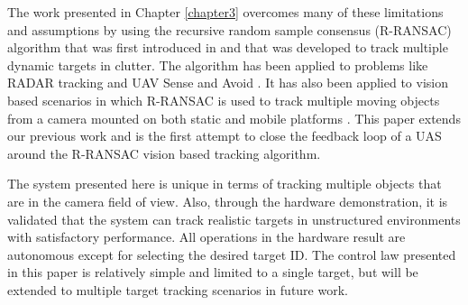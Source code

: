The work presented in Chapter \ref{chapter3} overcomes many of these limitations and assumptions by using the recursive random sample consensus (R-RANSAC) algorithm that was first introduced in \cite{Niedfeldt2014} and that was developed to track multiple dynamic targets in clutter. The algorithm has been applied to problems like RADAR tracking \cite{Quist2016, Niedfeldt2014} and UAV Sense and Avoid \cite{Wikle2012}. It has also been applied to vision based scenarios in which R-RANSAC is used to track multiple moving objects from a camera mounted on both static and mobile platforms \cite{Ingersoll2015, Defranco2015}. This paper extends our previous work and is the first attempt to close the feedback loop of a UAS around the R-RANSAC vision based tracking algorithm. 

The system presented here is unique in terms of tracking multiple objects that are in the camera field of view. Also, through the hardware demonstration, it is validated that the system can track realistic targets in unstructured environments with satisfactory performance. All operations in the hardware result are autonomous except for selecting the desired target ID. The control law presented in this paper is relatively simple and limited to a single target, but will be extended to multiple target tracking scenarios in future work.

